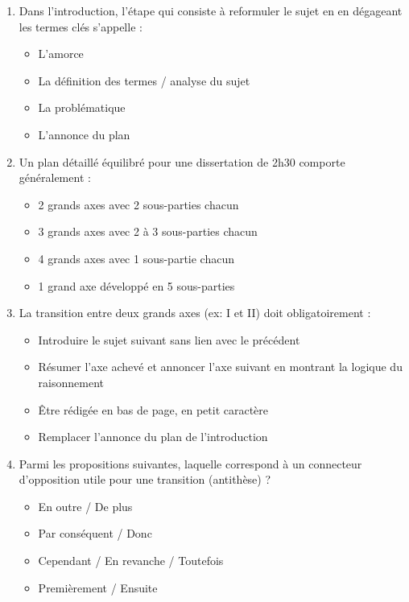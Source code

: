 \documentclass[11pt]{article}
\begin{document}
\begin{exercice}
\begin{enumerate}
    \item Dans l'introduction, l'étape qui consiste à reformuler le sujet en en dégageant les termes clés s'appelle :
    \begin{itemize}
        \item[A.] L'amorce
        \item[B.] La définition des termes / analyse du sujet
        \item[C.] La problématique
        \item[D.] L'annonce du plan
    \end{itemize}
    \item Un plan détaillé équilibré pour une dissertation de 2h30 comporte généralement :
    \begin{itemize}
        \item[A.] 2 grands axes avec 2 sous-parties chacun
        \item[B.] 3 grands axes avec 2 à 3 sous-parties chacun
        \item[C.] 4 grands axes avec 1 sous-partie chacun
        \item[D.] 1 grand axe développé en 5 sous-parties
    \end{itemize}
    \item La transition entre deux grands axes (ex: I et II) doit obligatoirement :
    \begin{itemize}
        \item[A.] Introduire le sujet suivant sans lien avec le précédent
        \item[B.] Résumer l'axe achevé et annoncer l'axe suivant en montrant la logique du raisonnement
        \item[C.] Être rédigée en bas de page, en petit caractère
        \item[D.] Remplacer l'annonce du plan de l'introduction
    \end{itemize}
    \item Parmi les propositions suivantes, laquelle correspond à un connecteur d'opposition utile pour une transition (antithèse) ?
    \begin{itemize}
        \item[A.] En outre / De plus
        \item[B.] Par conséquent / Donc
        \item[C.] Cependant / En revanche / Toutefois
        \item[D.] Premièrement / Ensuite
    \end{itemize}
\end{enumerate}
\end{exercice}
\end{document}
